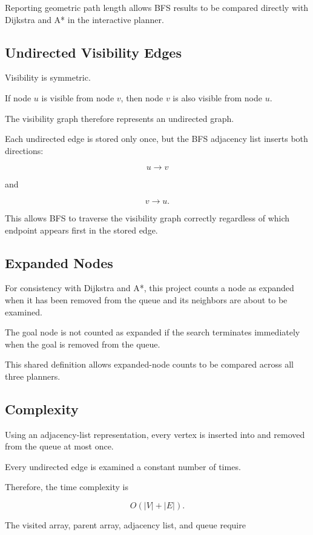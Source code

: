 Reporting geometric path length allows BFS results to be compared directly
with Dijkstra and A* in the interactive planner.

\subsection{Undirected Visibility Edges}

Visibility is symmetric.

If node $u$ is visible from node $v$, then node $v$ is also visible from
node $u$.

The visibility graph therefore represents an undirected graph.

Each undirected edge is stored only once, but the BFS adjacency list inserts
both directions:

\[
u \rightarrow v
\]

and

\[
v \rightarrow u.
\]

This allows BFS to traverse the visibility graph correctly regardless of
which endpoint appears first in the stored edge.

\subsection{Expanded Nodes}

For consistency with Dijkstra and A*, this project counts a node as expanded
when it has been removed from the queue and its neighbors are about to be
examined.

The goal node is not counted as expanded if the search terminates immediately
when the goal is removed from the queue.

This shared definition allows expanded-node counts to be compared across all
three planners.

\subsection{Complexity}

Using an adjacency-list representation, every vertex is inserted into and
removed from the queue at most once.

Every undirected edge is examined a constant number of times.

Therefore, the time complexity is

\[
O(|V|+|E|).
\]

The visited array, parent array, adjacency list, and queue require

